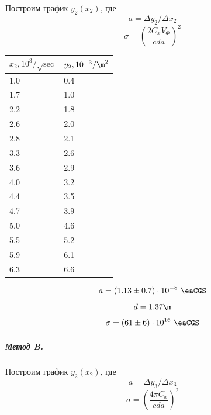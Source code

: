 \documentclass{report}
\begin{document}
Построим график $y_2(x_2)$, где
\\
$$
	a = \Delta y_2 / \Delta x_2
$$
$$
	\sigma = \left(\frac{2 C_x V_\Phi}{c d a}\right)^2
$$
\begin{table}[H]
	\centering
	\begin{tabular}{|l|l|}
		\hline
		$x_2, 10^{3} / \sqrt\sec$ & $y_2, 10^{-3} / \m^2$ \\
		\hline
		1.0                       & 0.4                   \\
		1.7                       & 1.0                   \\
		2.2                       & 1.8                   \\
		2.6                       & 2.0                   \\
		2.8                       & 2.1                   \\
		3.3                       & 2.6                   \\
		3.6                       & 2.9                   \\
		4.0                       & 3.2                   \\
		4.4                       & 3.5                   \\
		4.7                       & 3.9                   \\
		5.0                       & 4.6                   \\
		5.5                       & 5.2                   \\
		5.9                       & 6.1                   \\
		6.3                       & 6.6                   \\
		\hline
	\end{tabular}
\end{table}
\begin{figure}[H]
	\centering
	
\end{figure}
$$
	a = (1.13 \pm 0.7) \cdot 10^{-8}\ \eaCGS
$$
$$
	d = 1.37 \m
$$
$$
	\sigma = (61 \pm 6) \cdot 10^{16}\ \eaCGS
$$
\subparagraph{Метод B.}
Построим график $y_2(x_2)$, где
\\
$$
	a = \Delta y_3 / \Delta x_3
$$
$$
	\sigma = \left(\frac{4 \pi C_x}{c d a}\right)^2
$$
\end{document}
